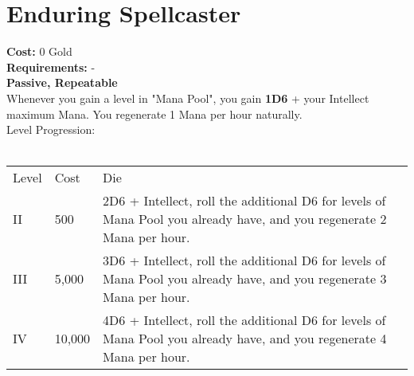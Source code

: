 \section{Enduring Spellcaster}\label{sec:enduringspellcaster}
\textbf{Cost:} 0 Gold\\
\textbf{Requirements:} -\\
\textbf{Passive, Repeatable}\\
Whenever you gain a level in "Mana Pool", you gain \textbf{1D6} + your Intellect maximum Mana.
You regenerate 1 Mana per hour naturally.
\\
Level Progression:\\
\\
\begin{tabular}{l | l | p{12cm} }
	Level & Cost & Die\\
	II & 500 & 2D6 + Intellect, roll the additional D6 for levels of Mana Pool you already have, and you regenerate 2 Mana per hour. \\
	III & 5,000 & 3D6 + Intellect, roll the additional D6 for levels of Mana Pool you already have, and you regenerate 3 Mana per hour. \\
	IV & 10,000 & 4D6 + Intellect, roll the additional D6 for levels of Mana Pool you already have, and you regenerate 4 Mana per hour.\\
\end{tabular}